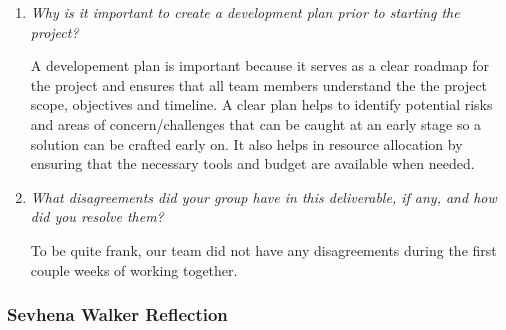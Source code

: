\documentclass{article}
\begin{document}
\begin{enumerate}
  \item \textit{Why is it important to create a development plan prior to starting the
    project?}
    
    A developement plan is important because it serves as a clear roadmap for the project and ensures that all 
    team members understand the the project scope, objectives and timeline. A clear plan helps to identify potential risks
    and areas of concern/challenges that can be caught at an early stage so a solution can be crafted early on. It also helps 
    in resource allocation by ensuring that the necessary tools and budget are available when needed.
    
  \item \textit{What disagreements did your group have in this deliverable, if any, and how did you resolve them?}
  
    To be quite frank, our team did not have any disagreements during the first couple weeks of working together.
    
\end{enumerate}

\subsubsection*{Sevhena Walker Reflection}
\end{document}
